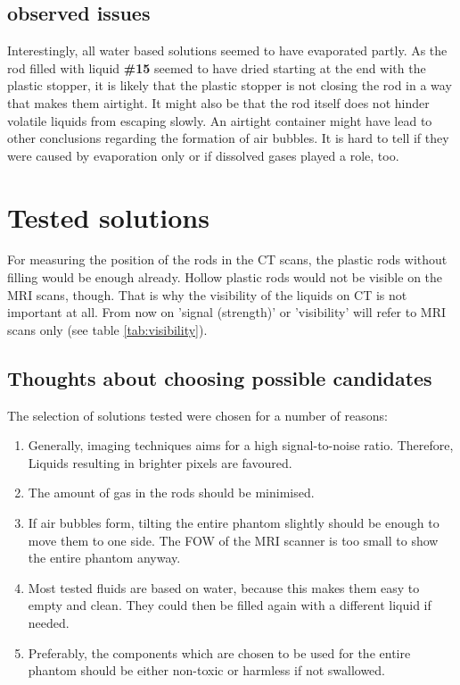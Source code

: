 \subsection{observed issues}

Interestingly, all water based solutions seemed to have evaporated partly.
As the rod filled with liquid \textbf{\#15} seemed to have dried starting at the end with the plastic stopper, it is likely that the plastic stopper is not closing the rod in a way that makes them airtight.
It might also be that the rod itself does not hinder volatile liquids from escaping slowly.
An airtight container might have lead to other conclusions regarding the formation of air bubbles.
It is hard to tell if they were caused by evaporation only or if dissolved gases played a role, too.

\section{Tested solutions}

For measuring the position of the rods in the CT scans, the plastic rods without filling would be enough already.
Hollow plastic rods would not be visible on the MRI scans, though.
That is why the visibility of the liquids on CT is not important at all.
From now on 'signal (strength)' or 'visibility' will refer to MRI scans only (see table \ref{tab:visibility}).

\subsection{Thoughts about choosing possible candidates}

The selection of solutions tested were chosen for a number of reasons:
\begin{enumerate}[label=\textbf{\arabic*.}]
\item Generally, imaging techniques aims for a high signal-to-noise ratio. Therefore, Liquids resulting in brighter pixels are favoured.
\item The amount of gas in the rods should be minimised.
\item If air bubbles form, tilting the entire phantom slightly should be enough to move them to one side. The FOW of the MRI scanner is too small to show the entire phantom anyway.
\item Most tested fluids are based on water, because this makes them easy to empty and clean.
They could then be filled again with a different liquid if needed.
\item Preferably, the components which are chosen to be used for the entire phantom should be either non-toxic or harmless if not swallowed.
\end{enumerate}

